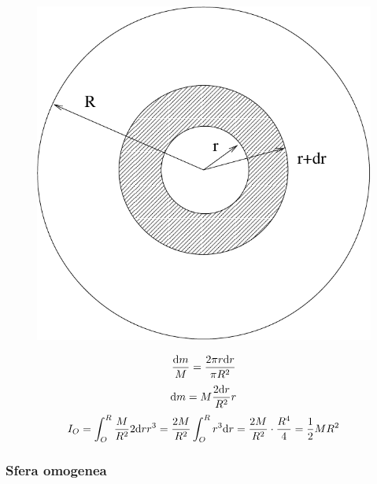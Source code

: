 \begin{figure}[htbp]
   \centering
   \includegraphics[scale=0.3]{immagini/fisica1/disco}
\end{figure}

\begin{equation*}\frac{\mathrm{d} m}{M}=\frac{2\pi r\mathrm{d} r}{\pi R^2}\end{equation*}
\begin{equation*}\mathrm{d} m=M\frac{2\mathrm{d} r}{R^2}r\end{equation*}
\[I_O=\int_O^R\frac{M}{R^2}2\mathrm{d} r r^3=\frac{2M}{R^2}\int_O^R r^3
\mathrm{d} r=\frac{2M}{R^2}\cdot\frac{R^4}{4}=\frac{1}{2}MR^2\]

\subsubsection{Sfera omogenea}

